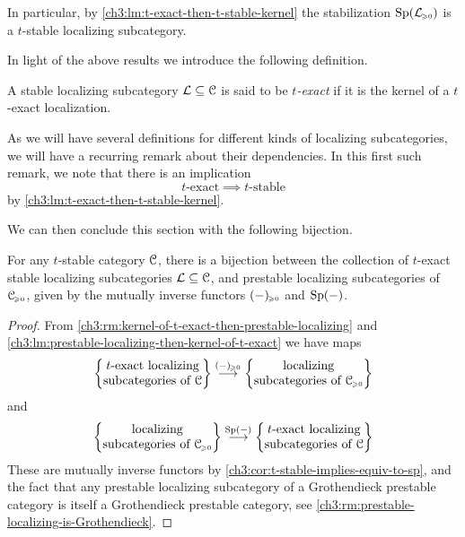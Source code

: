 \begin{remark}
    In particular, by \cref{ch3:lm:t-exact-then-t-stable-kernel} the stabilization $\mathrm{Sp}(\mathcal{L}_{\hspace{-1pt}\scriptscriptstyle\geqslant 0})$ is a $t$-stable localizing subcategory. 
\end{remark}

In light of the above results we introduce the following definition. 

\begin{definition}
    A stable localizing subcategory $\mathcal{L}\subseteq \EuScript{C}$ is said to be \emph{$t$-exact} if it is the kernel of a $t$-exact localization. 
\end{definition}

\begin{remark}
    \label{ch3:rm:recurring-1}
    As we will have several definitions for different kinds of localizing subcategories, we will have a recurring remark about their dependencies. In this first such remark, we note that there is an implication
    \[t\text{-exact}\implies t\text{-stable}\]
    by \cref{ch3:lm:t-exact-then-t-stable-kernel}. 
\end{remark}

We can then conclude this section with the following bijection. 

\begin{corollary}
    \label{ch3:cor:t-exact-corresponds-to-prestable-localizing}
    For any $t$-stable category $\EuScript{C}$, there is a bijection between the collection of $t$-exact stable localizing subcategories $\mathcal{L}\subseteq \EuScript{C}$, and prestable localizing subcategories of $\EuScript{C}_{\hspace{-1pt}\scriptscriptstyle\geqslant 0}$, given by the mutually inverse functors $(-)_{\hspace{-1pt}\scriptscriptstyle\geqslant 0}$ and $\mathrm{Sp}(-)$. 
\end{corollary}
\begin{proof}
    From \cref{ch3:rm:kernel-of-t-exact-then-prestable-localizing} and \cref{ch3:lm:prestable-localizing-then-kernel-of-t-exact} we have maps 
    \[\left\{ \begin{matrix} t\text{-exact localizing}\\ \text{subcategories of }\EuScript{C} \end{matrix} \right\}\overset{(-)_{\hspace{-1pt}\scriptscriptstyle\geqslant 0}}{\longrightarrow} \left\{ \begin{matrix} \text{localizing}\\ \text{subcategories of }\EuScript{C}_{\hspace{-1pt}\scriptscriptstyle\geqslant 0} \end{matrix} \right\}\] 
    and 
    \[\left\{ \begin{matrix} \text{localizing}\\ \text{subcategories of }\EuScript{C}_{\hspace{-1pt}\scriptscriptstyle\geqslant 0} \end{matrix} \right\}\overset{\mathrm{Sp}(-)}{\longrightarrow} \left\{ \begin{matrix} t\text{-exact localizing}\\ \text{subcategories of }\EuScript{C} \end{matrix} \right\}\] 
    These are mutually inverse functors by \cref{ch3:cor:t-stable-implies-equiv-to-sp}, and the fact that any prestable localizing subcategory of a Grothendieck prestable category is itself a Grothendieck prestable category, see \cref{ch3:rm:prestable-localizing-is-Grothendieck}. 
\end{proof}



